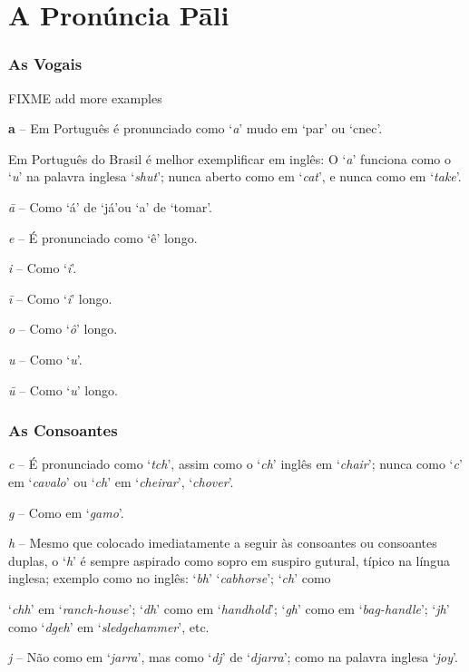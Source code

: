 \chapter{A Pronúncia Pāli}

\subsection{As Vogais}

FIXME add more examples

\textbf{a} -- Em Português é pronunciado como `\emph{a}' mudo em `par' ou `cnec'.

Em Português do Brasil é melhor exemplificar em inglês: O `\emph{a}' funciona como o `\emph{u}' na palavra inglesa `\emph{shut}'; nunca aberto como em `\emph{cat}', e nunca como em `\emph{take}'.

\emph{ā} -- Como `á' de `já'ou `a' de `tomar'.

\emph{e} -- É pronunciado como `ê' longo.

\emph{i} -- Como `\emph{i}'.

\emph{ī} -- Como `\emph{i}' longo.

\emph{o} -- Como `\emph{ô}' longo.

\emph{u} -- Como `\emph{u}'.

\emph{ū} -- Como `\emph{u}' longo.

\subsection{As Consoantes}

\emph{c} -- É pronunciado como `\emph{tch}', assim como o `\emph{ch}' inglês em `\emph{chair}'; nunca como `\emph{c}' em `\emph{cavalo}' ou `\emph{ch}' em `\emph{cheirar}', `\emph{chover}'.

\emph{g} -- Como em `\emph{gamo}'.

\emph{h} -- Mesmo que colocado imediatamente a seguir às consoantes ou consoantes duplas, o `\emph{h}' é sempre aspirado como sopro em suspiro gutural, típico na língua inglesa; exemplo como no inglês: `\emph{bh}' `\emph{cabhorse}'; `\emph{ch}' como

`\emph{chh}' em `\emph{ranch-house}'; `\emph{dh}' como em `\emph{handhold}'; `\emph{gh}' como em `\emph{bag-handle}'; `\emph{jh}' como `\emph{dgeh}' em `\emph{sledgehammer}', etc.

\emph{j} -- Não como em `\emph{jarra}', mas como `\emph{dj}' de `\emph{djarra}'; como na palavra inglesa `\emph{joy}'.

